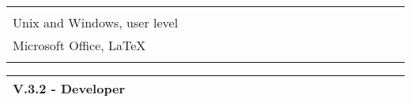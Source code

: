 \documentclass[11pt, letterpaper]{extarticle}
\begin{document}
	\begin{longtable}{L{1.012\linewidth}N}
		                                                                                                                                                                                                                                                                                                             & \\[-0.25cm]
		Unix and Windows, user level                                                                                                                                                                                                                                                                                 & \\[0.40cm]
		Microsoft Office, LaTeX                                                                                                                                                                                                                                                                                      & \\[0.40cm]
		                                                                                                                                                                                                                                                                                                             & \\[-0.25cm] \hline
	\end{longtable}


	\label{sec:V.3.2.}
	\begin{longtable}{L{1.012\linewidth}N}
		\textbf{\large V.3.2 - Developer} & \\[0.60cm] \hline
	\end{longtable}
\end{document}

